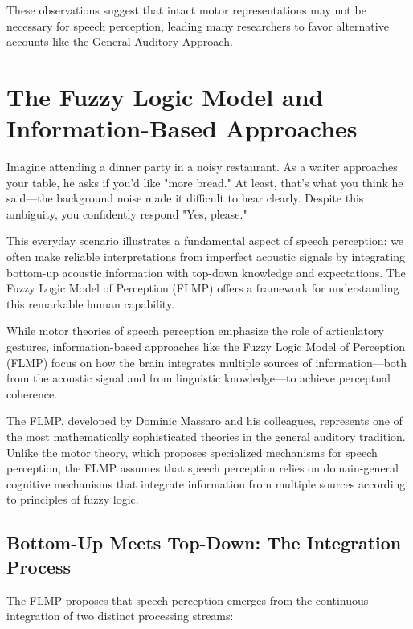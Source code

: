 \documentclass[12pt,a4paper]{article}
\begin{document}
These observations suggest that intact motor representations may not be necessary for speech perception, leading many researchers to favor alternative accounts like the General Auditory Approach.

\section{The Fuzzy Logic Model and Information-Based Approaches}

\begin{tcolorbox}[enhanced, colback=cyan!5, colframe=cyan!75!black, title=The Dinner Party Scenario]
Imagine attending a dinner party in a noisy restaurant. As a waiter approaches your table, he asks if you'd like "more bread." At least, that's what you think he said—the background noise made it difficult to hear clearly. Despite this ambiguity, you confidently respond "Yes, please." 

This everyday scenario illustrates a fundamental aspect of speech perception: we often make reliable interpretations from imperfect acoustic signals by integrating bottom-up acoustic information with top-down knowledge and expectations. The Fuzzy Logic Model of Perception (FLMP) offers a framework for understanding this remarkable human capability.
\end{tcolorbox}

While motor theories of speech perception emphasize the role of articulatory gestures, information-based approaches like the Fuzzy Logic Model of Perception (FLMP) focus on how the brain integrates multiple sources of information—both from the acoustic signal and from linguistic knowledge—to achieve perceptual coherence.

The FLMP, developed by Dominic Massaro and his colleagues, represents one of the most mathematically sophisticated theories in the general auditory tradition. Unlike the motor theory, which proposes specialized mechanisms for speech perception, the FLMP assumes that speech perception relies on domain-general cognitive mechanisms that integrate information from multiple sources according to principles of fuzzy logic.

\subsection{Bottom-Up Meets Top-Down: The Integration Process}

The FLMP proposes that speech perception emerges from the continuous integration of two distinct processing streams:
\end{document}

